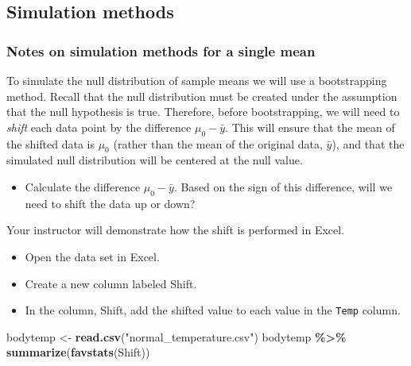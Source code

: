\documentclass[
]{report}
\newenvironment{Shaded}{\begin{snugshade}}{\end{snugshade}}
\newcommand{\FunctionTok}[1]{\textcolor[rgb]{0.13,0.29,0.53}{\textbf{#1}}}
\newcommand{\NormalTok}[1]{#1}
\newcommand{\OtherTok}[1]{\textcolor[rgb]{0.56,0.35,0.01}{#1}}
\newcommand{\SpecialCharTok}[1]{\textcolor[rgb]{0.81,0.36,0.00}{\textbf{#1}}}
\newcommand{\StringTok}[1]{\textcolor[rgb]{0.31,0.60,0.02}{#1}}
\providecommand{\tightlist}{%
  \setlength{\itemsep}{0pt}\setlength{\parskip}{0pt}}
\begin{document}
\vspace{1in}

\subsection*{Simulation methods}\label{simulation-methods-2}

\subsubsection*{Notes on simulation methods for a single mean}\label{notes-on-simulation-methods-for-a-single-mean}

\vspace{2in}

To simulate the null distribution of sample means we will use a bootstrapping method. Recall that the null distribution must be created under the assumption that the null hypothesis is true. Therefore, before bootstrapping, we will need to \emph{shift} each data point by the difference \(\mu_0 - \bar{y}\). This will ensure that the mean of the shifted data is \(\mu_0\) (rather than the mean of the original data, \(\bar{y}\)), and that the simulated null distribution will be centered at the null value.

\begin{itemize}
\tightlist
\item
  Calculate the difference \(\mu_0 - \bar{y}\). Based on the sign of this difference, will we need to shift the data up or down?
\end{itemize}

\vspace{0.4in}

Your instructor will demonstrate how the shift is performed in Excel.

\begin{itemize}
\item
  Open the data set in Excel.
\item
  Create a new column labeled Shift.
\item
  In the column, Shift, add the shifted value to each value in the \texttt{Temp} column.
\end{itemize}

\begin{Shaded}
\begin{Highlighting}[]
\NormalTok{bodytemp }\OtherTok{\textless{}{-}} \FunctionTok{read.csv}\NormalTok{(}\StringTok{"normal\_temperature.csv"}\NormalTok{)}
\NormalTok{bodytemp }\SpecialCharTok{\%\textgreater{}\%}
    \FunctionTok{summarize}\NormalTok{(}\FunctionTok{favstats}\NormalTok{(Shift))}
\end{Highlighting}
\end{Shaded}
\end{document}
